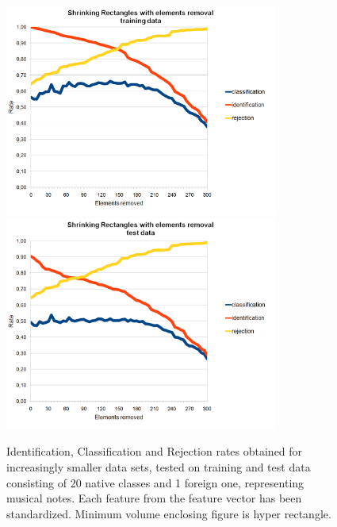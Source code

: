 \begin{figure}[htp]
	\centering
	\includegraphics[width=0.80\textwidth]{Figures/charts/MUSIC_NOTES_STANDARIZED/DIGITS_ShrinkingRectanglesElementsRemovalTraining.png}
	\hspace{12pt}
	\includegraphics[width=0.80\textwidth]{Figures/charts/MUSIC_NOTES_STANDARIZED/DIGITS_ShrinkingRectanglesElementsRemovalTest.png}
	\caption{ Identification, Classification and Rejection rates obtained for increasingly smaller data sets, tested on training and test data consisting of 20 native classes and 1 foreign one, representing musical notes. Each feature from the feature vector has been standardized. Minimum volume enclosing figure is hyper rectangle. }
\end{figure}